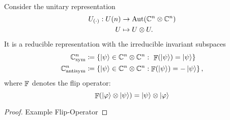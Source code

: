 \documentclass[a4paper,11pt, BCOR=4mm, DIV=12, pagesize]{scrartcl}
\begin{document}
\begin{example}\ \\
 Consider the unitary representation 
 \begin{align*}
  U_{(\cdot)}: {U(n)} &\to \mathrm{Aut}(\mathbb{C}^n\otimes\mathbb{C}^n)\\
  U&\mapsto U\otimes U.
 \end{align*}
 It is a reducible representation with the irreducible invariant subspaces 
 \begin{align*}
  \mathbb{C}^n_{\text{sym}} &\coloneqq \left\{\ket{\psi}\in\mathbb{C}^n\otimes\mathbb{C}^n:\  
\mathop{\mathbb{F}}(\ket{\psi}) = \ket{\psi}\right\}\\
  \mathbb{C}^n_{\text{antisym}} &\coloneqq \left\{\ket{\psi}\in\mathbb{C}^n\otimes\mathbb{C}^n: 
\mathop{\mathbb{F}}(\ket{\psi}) = -\ket{\psi}\right\},
 \end{align*}
 where $\mathop{\mathbb{F}}$ denotes the flip operator:
 \begin{equation}
  \mathop{\mathbb{F}}(\ket{\varphi}\otimes\ket{\psi}) = \ket{\psi}\otimes \ket{\varphi}
 \end{equation}

\end{example}
\begin{proof}
\todo Example Flip-Operator 
\end{proof}
\end{document}
